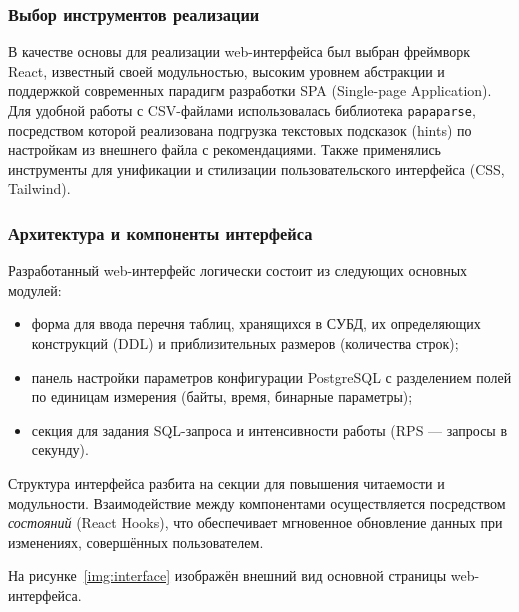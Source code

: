 \subsubsection{Выбор инструментов реализации}

В качестве основы для реализации web-интерфейса был выбран фреймворк React, известный своей модульностью, высоким уровнем абстракции и поддержкой современных парадигм разработки SPA (Single-page Application). Для удобной работы с CSV-файлами использовалась библиотека \texttt{papaparse}, посредством которой реализована подгрузка текстовых подсказок (hints) по настройкам из внешнего файла с рекомендациями. Также применялись инструменты для унификации и стилизации пользовательского интерфейса (CSS, Tailwind).

\subsubsection{Архитектура и компоненты интерфейса}

Разработанный web-интерфейс логически состоит из следующих основных модулей:
\begin{itemize}
    \item форма для ввода перечня таблиц, хранящихся в СУБД, их определяющих конструкций (DDL) и приблизительных размеров (количества строк);
    \item панель настройки параметров конфигурации PostgreSQL с разделением полей по единицам измерения (байты, время, бинарные параметры);
    \item секция для задания SQL-запроса и интенсивности работы (RPS --- запросы в секунду).
\end{itemize}

Структура интерфейса разбита на секции для повышения читаемости и модульности. Взаимодействие между компонентами осуществляется посредством \emph{состояний} (React Hooks), что обеспечивает мгновенное обновление данных при изменениях, совершённых пользователем.

На рисунке~\ref{img:interface} изображён внешний вид основной страницы web-интерфейса.

